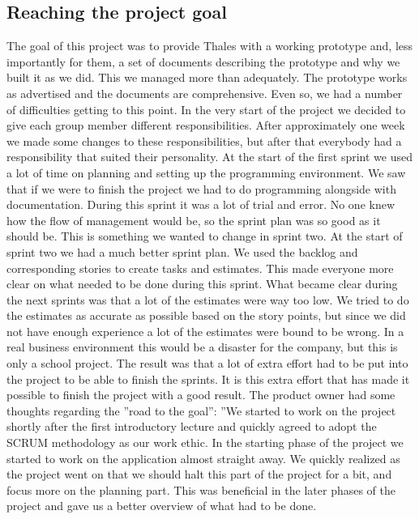 \subsection{Reaching the project goal}
The goal of this project was to provide Thales with a working prototype and, less importantly for them, a set of documents describing the prototype and why we built it as we did. This we managed more than adequately. The prototype works as advertised and the documents are comprehensive. Even so, we had a number of difficulties getting to this point.
\newline
\newline
In the very start of the project we decided to give each group member different responsibilities. After approximately one week we made some changes to these responsibilities, but after that everybody had a responsibility that suited their personality.
\newline
\newline
At the start of the first sprint we used a lot of time on planning and setting up the programming environment. We saw that if we were to finish the project we had to do programming alongside with documentation. During this sprint it was a lot of trial and error. No one knew how the flow of management would be, so the sprint plan was so good as it should be. This is something we wanted to change in sprint two.
\newline
\newline
At the start of sprint two we had a much better sprint plan. We used the backlog and corresponding stories to create tasks and estimates. This made everyone more clear on what needed to be done during this sprint.
\newline
\newline
What became clear during the next sprints was that a lot of the estimates were way too low. We tried to do the estimates as accurate as possible based on the story points, but since we did not have enough experience a lot of the estimates were bound to be wrong. In a real business environment this would be a disaster for the company, but this is only a school project. The result was that a lot of extra effort had to be put into the project to be able to finish the sprints. It is this extra effort that has made it possible to finish the project with a good result. 
\newpage
The product owner had some thoughts regarding the ''road to the goal'':
\newline
\newline
''We started to work on the project shortly after the first introductory lecture and quickly agreed to adopt the SCRUM methodology as our work ethic. In the starting phase of the project we started to work on the application almost straight away. We quickly realized as the project went on that we should halt this part of the project for a bit, and focus more on the planning part. This was beneficial in the later phases of the project and gave us a better overview of what had to be done.
